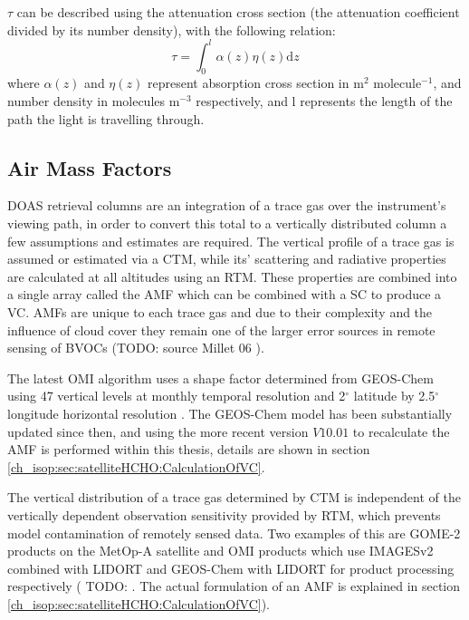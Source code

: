     
    $\tau$ can be described using the attenuation cross section (the attenuation coefficient divided by its number density), with the following relation:
    \begin{equation*}
      \tau = \int_0^l \alpha(z)\eta(z)\mathrm{d}z
    \end{equation*}
    where $\alpha(z)$ and $\eta(z)$ represent absorption cross section in m$^2$ molecule$^{-1}$, and number density in molecules m$^{-3}$ respectively, and l represents the length of the path the light is travelling through. 
  
  
  \subsection{Air Mass Factors}
    \label{ch_isop:sec:satelliteHCHO:AMFs}
    DOAS retrieval columns are an integration of a trace gas over the instrument's viewing path, in order to convert this total to a vertically distributed column a few assumptions and estimates are required. 
    The vertical profile of a trace gas is assumed or estimated via a CTM, while its' scattering and radiative properties are calculated at all altitudes using an RTM. 
    These properties are combined into a single array called the AMF which can be combined with a SC to produce a VC.
    AMFs are unique to each trace gas and due to their complexity and the influence of cloud cover they remain one of the larger error sources in remote sensing of BVOCs (TODO: source Millet 06 \citep{Palmer2001}).
    
    The latest OMI algorithm uses a shape factor determined from GEOS-Chem using 47 vertical levels at monthly temporal resolution and 2$^{\circ}$ latitude by 2.5$^{\circ}$ longitude horizontal resolution \citep{Gonzalez2015}.
    The GEOS-Chem model has been substantially updated since then, and using the more recent version $V10.01$ to recalculate the AMF is performed within this thesis, details are shown in section \ref{ch_isop:sec:satelliteHCHO:CalculationOfVC}.
    
    The vertical distribution of a trace gas determined by CTM is independent of the vertically dependent observation sensitivity provided by RTM, which prevents model contamination of remotely sensed data.
    Two examples of this are GOME-2 products on the MetOp-A satellite and OMI products which use IMAGESv2 combined with LIDORT and GEOS-Chem with LIDORT for product processing respectively ( TODO: %
    \citep{Gonzalez2015}.
    The actual formulation of an AMF is explained in section \ref{ch_isop:sec:satelliteHCHO:CalculationOfVC}).
  
